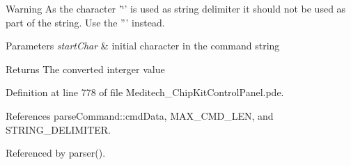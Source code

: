 \begin{DoxyWarning}{Warning}
As the character '\char`\"{}' is used as string delimiter it should not be used as part of the string. Use the ''' instead.
\end{DoxyWarning}

\begin{DoxyParams}{Parameters}
{\em start\-Char} & initial character in the command string \\
\hline
\end{DoxyParams}
\begin{DoxyReturn}{Returns}
The converted interger value 
\end{DoxyReturn}


Definition at line 778 of file Meditech\-\_\-\-Chip\-Kit\-Control\-Panel.\-pde.



References parse\-Command\-::cmd\-Data, M\-A\-X\-\_\-\-C\-M\-D\-\_\-\-L\-E\-N, and S\-T\-R\-I\-N\-G\-\_\-\-D\-E\-L\-I\-M\-I\-T\-E\-R.



Referenced by parser().


